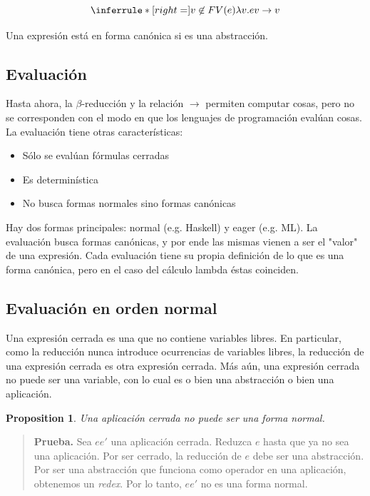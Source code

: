\documentclass[article, 12pt]{article}
\newtheorem{proposition}{Proposition}
\begin{document}
\begin{equation*}
\inferrule* [right=] {v \not\in FV(e)}{\lambda v. ev \to v}
\end{equation*}

\begin{definition}
  Una expresión está en forma canónica si es una abstracción.
\end{definition}

\subsection{Evaluación}

Hasta ahora, la $\beta$-reducción y la relación $\to $ permiten computar cosas,
pero no se corresponden con el modo en que los lenguajes de programación evalúan
cosas. La evaluación tiene otras características:

\begin{itemize}
  \item Sólo se evalúan fórmulas cerradas 
  \item Es determinística 
  \item No busca formas normales sino formas canónicas
\end{itemize}

Hay dos formas principales: normal (e.g. Haskell) y eager (e.g. ML). La
evaluación busca formas canónicas, y por ende las mismas vienen a ser el "valor"
de una expresión. Cada evaluación tiene su propia definición de lo que es una
forma canónica, pero en el caso del cálculo lambda éstas coinciden.

\subsection{Evaluación en orden normal}

Una expresión cerrada es una que no contiene variables libres. En particular,
como la reducción nunca introduce ocurrencias de variables libres, la reducción
de una expresión cerrada es otra expresión cerrada. Más aún, una expresión
cerrada no puede ser una variable, con lo cual es o bien una abstracción o bien
una aplicación.

\begin{proposition}
  Una aplicación cerrada no puede ser una forma normal.
\end{proposition}


\small
\begin{quote}

\textbf{Prueba.} Sea $e e'$ una aplicación cerrada. Reduzca $e$ hasta que ya no
sea una aplicación. Por ser cerrado, la reducción de $e$ debe ser una
abstracción. Por ser una abstracción que funciona como operador en una
aplicación, obtenemos un \textit{redex}. Por lo tanto, $e e'$ no es una forma
normal.

\end{quote}
\normalsize
\end{document}
